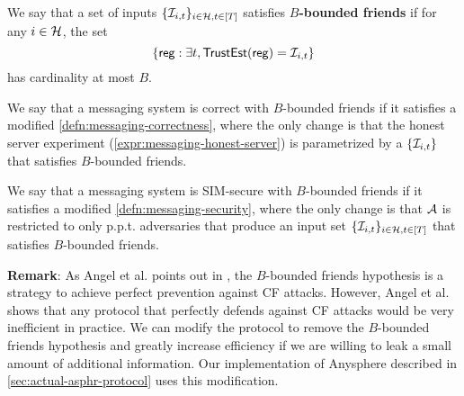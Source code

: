 
\begin{definition}
\label{defn:messaging-security-weaker}
We say that a set of inputs $\{\mathcal{I}_{i, t}\}_{i \in \mathcal{H}, t \in [T]}$ satisfies \textbf{$B$-bounded friends} if for any $i \in \mathcal{H}$, the set
$$\{\mathsf{reg}: \exists t, \mathsf{TrustEst}(\mathsf{reg}) = \mathcal{I}_{i, t}\}$$
has cardinality at most $B$.

We say that a messaging system is correct with $B$-bounded friends if it satisfies a modified \cref{defn:messaging-correctness}, where the only change is that the honest server experiment (\cref{expr:messaging-honest-server}) is parametrized by a $\{\mathcal{I}_{i, t}\}$ that satisfies $B$-bounded friends.

We say that a messaging system is SIM-secure with $B$-bounded friends if it satisfies a modified \cref{defn:messaging-security}, where the only change is that $\mathcal{A}$ is restricted to only p.p.t. adversaries that produce an input set $\{\mathcal{I}_{i, t}\}_{i \in \mathcal{H}, t \in [T]}$ that satisfies $B$-bounded friends.
\end{definition}

\textbf{Remark}: As  Angel et al. points out in \cite{angel2018cf}, the $B$-bounded friends hypothesis is a strategy to achieve perfect prevention against CF attacks. However, Angel et al. shows that any protocol that perfectly defends against CF attacks would be very inefficient in practice. We can modify the protocol to remove the $B$-bounded friends hypothesis and greatly increase efficiency if we are willing to leak a small amount of additional information. Our implementation of Anysphere described in \cref{sec:actual-asphr-protocol} uses this modification.